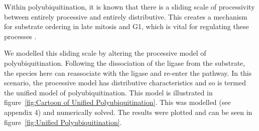 \documentclass[11pt]{article}
\begin{document}
Within polyubiquitination, it is known that there is a sliding scale of processivity between entirely processive and entirely distributive. This creates a mechanism for substrate ordering in late mitosis and G1, which is vital for regulating these processes \cite{rape2006processivity}. 

We modelled this sliding scale by altering the processive model of polyubiquitination. Following the dissociation of the ligase from the substrate, the species here can reassociate with the ligase and re-enter the pathway. In this scenario, the processive model has distributive characteristics and so is termed the unified model of polyubiquitination. This model is illustrated in figure~\ref{fig:Cartoon of Unified Polyubiquitination}. This was modelled (see appendix 4) and numerically solved. The results were plotted and can be seen in figure~\ref{fig:Unified Polyubiquitination}.

\end{document}
